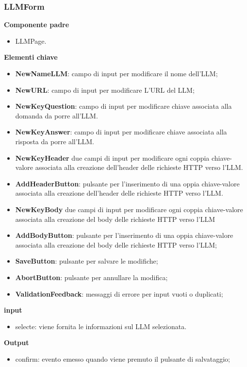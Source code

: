 \subsubsection{LLMForm}
\textbf{Componente padre}
\begin{itemize}
    \item LLMPage.
\end{itemize}
\textbf{Elementi chiave}
\begin{itemize}
    \item \textbf{NewNameLLM}: campo di input per modificare il nome dell'LLM;
    \item \textbf{NewURL}: campo di input per modificare L'URL del LLM;
    \item \textbf{NewKeyQuestion}: campo di input per modificare chiave associata alla domanda da porre all'LLM.
    \item \textbf{NewKeyAnswer}: campo di input per modificare chiave associata alla risposta da porre all'LLM.
    \item \textbf{NewKeyHeader} due campi di input per modificare ogni coppia chiave-valore associata alla creazione dell’header delle richieste HTTP verso l’LLM.
    \item \textbf{AddHeaderButton}: pulsante per l'inserimento di una oppia chiave-valore associata alla creazione dell’header delle richieste HTTP verso l’LLM.
    \item \textbf{NewKeyBody} due campi di input per modificare ogni coppia chiave-valore associata alla creazione del body delle richieste HTTP verso l’LLM
    \item \textbf{AddBodyButton}: pulsante per l'inserimento di una oppia chiave-valore associata alla creazione del body delle richieste HTTP verso l’LLM; 
    \item \textbf{SaveButton}: pulsante per salvare le modifiche;
    \item \textbf{AbortButton}: pulsante per annullare la modifica;
    \item \textbf{ValidationFeedback}: messaggi di errore per input vuoti o duplicati;
\end{itemize}
\textbf{input}
\begin{itemize}
    \item selecte: viene fornita le informazioni sul LLM selezionata.
\end{itemize}
\textbf{Output}
\begin{itemize}
    \item confirm: evento emesso quando viene premuto il pulsante di salvataggio;
\end{itemize}